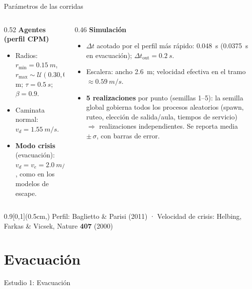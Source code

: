 \documentclass[10pt,aspectratio=169,t]{beamer}
\newcommand{\fuente}[1]{%
  \begin{textblock*}{0.9\paperwidth}[0,1](0.5cm,\dimexpr\paperheight-0.35cm\relax)
    {\tiny\color{gray} #1}%
  \end{textblock*}}
\begin{document}
\begin{frame}[c]{Parámetros de las corridas}
  \begin{columns}[T]
    \begin{column}{0.52\textwidth}
      \textbf{Agentes (perfil CPM)}
      \begin{itemize}
        \item Radios: $r_{\min}=\SI{0.15}{m}$, $r_{\max}\sim\mathcal{U}(0.30,0.32)\,$m;
          $\tau=\SI{0.5}{s}$; $\beta=0.9$.
        \item Caminata normal: $v_d=\SI{1.55}{m/s}$.
        \item \textbf{Modo crisis} (evacuación): $v_d=v_e=\SI{2.0}{m/s}$, como en los
          modelos de escape.
      \end{itemize}
    \end{column}
    \begin{column}{0.46\textwidth}
      \textbf{Simulación}
      \begin{itemize}
        \item $\Delta t$ acotado por el perfil más rápido: \SI{0.048}{s}
          (\SI{0.0375}{s} en evacuación); $\Delta t_{\text{out}}=\SI{0.2}{s}$.
        \item Escalera: ancho \SI{2.6}{m}; velocidad efectiva en el tramo
          $\approx\SI{0.59}{m/s}$.
        \item \textbf{5 realizaciones} por punto (semillas 1--5): la semilla global
          gobierna todos los procesos aleatorios (spawn, ruteo, elección de salida/aula,
          tiempos de servicio) $\Rightarrow$ realizaciones independientes. Se reporta
          media $\pm\,\sigma$, con barras de error.
      \end{itemize}
    \end{column}
  \end{columns}
  \fuente{Perfil: Baglietto \& Parisi (2011) · Velocidad de crisis: Helbing, Farkas
    \& Vicsek, Nature \textbf{407} (2000)}
\end{frame}

\section{Evacuación}

\begin{frame}[plain,c]
  \centering
  {\fontsize{40}{48}\selectfont Estudio 1: Evacuación\par}
\end{frame}
\end{document}
